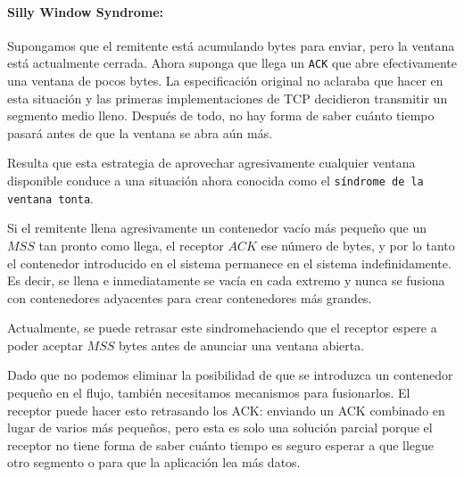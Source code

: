 \paragraph{Silly Window Syndrome:} Supongamos que el remitente está acumulando bytes para enviar, pero la ventana está actualmente cerrada. Ahora suponga que llega un \texttt{ACK} que abre efectivamente una ventana de pocos bytes. La especificación original no aclaraba que hacer en esta situación y las primeras implementaciones de TCP decidieron transmitir un segmento medio lleno. Después de todo, no hay forma de saber cuánto tiempo pasará antes de que la ventana se abra aún más.

Resulta que esta estrategia de aprovechar agresivamente cualquier ventana disponible conduce a una situación ahora conocida como el \texttt{síndrome de la ventana tonta}.

Si el remitente llena agresivamente un contenedor vacío más pequeño que un \(MSS\) tan pronto como llega, el receptor \(ACK\) ese número de bytes, y por lo tanto el contenedor introducido en el sistema permanece en el sistema indefinidamente. Es decir, se llena e inmediatamente se vacía en cada extremo y nunca se fusiona con contenedores adyacentes para crear contenedores más grandes.

Actualmente, se puede retrasar este sindromehaciendo que el receptor espere a poder aceptar \(MSS\) bytes antes de anunciar una ventana abierta.

Dado que no podemos eliminar la posibilidad de que se introduzca un contenedor pequeño en el flujo, también necesitamos mecanismos para fusionarlos. El receptor puede hacer esto retrasando los ACK: enviando un ACK combinado en lugar de varios más pequeños, pero esta es solo una solución parcial porque el receptor no tiene forma de saber cuánto tiempo es seguro esperar a que llegue otro segmento o para que la aplicación lea más datos.

